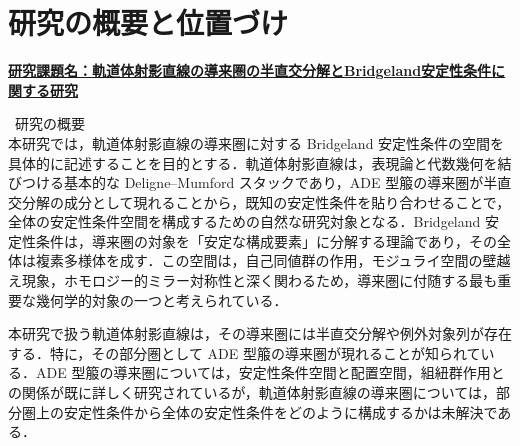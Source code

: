 \documentclass[11pt,a4paper]{ltjsarticle}
\newcommand{\研究課題名}{軌道体射影直線の導来圏の半直交分解とBridgeland安定性条件に関する研究}
\newcommand{\研究機関名}{大阪大学}
\newcommand{\研究代表者氏名}{山本 雄大}
\begin{document}

\section{研究の概要と位置づけ}

\noindent
\underline{\textbf{研究課題名：\研究課題名}}

\bullet\ 研究の概要\\ 本研究では，軌道体射影直線の導来圏に対する Bridgeland 安定性条件の空間を具体的に記述することを目的とする．軌道体射影直線は，表現論と代数幾何を結びつける基本的な Deligne--Mumford スタックであり，ADE 型箙の導来圏が半直交分解の成分として現れることから，既知の安定性条件を貼り合わせることで，全体の安定性条件空間を構成するための自然な研究対象となる．Bridgeland 安定性条件は，導来圏の対象を「安定な構成要素」に分解する理論であり，その全体は複素多様体を成す．この空間は，自己同値群の作用，モジュライ空間の壁越え現象，ホモロジー的ミラー対称性と深く関わるため，導来圏に付随する最も重要な幾何学的対象の一つと考えられている．

本研究で扱う軌道体射影直線は，その導来圏には半直交分解や例外対象列が存在する．特に，その部分圏として ADE 型箙の導来圏が現れることが知られている．ADE 型箙の導来圏については，安定性条件空間と配置空間，組紐群作用との関係が既に詳しく研究されているが，軌道体射影直線の導来圏については，部分圏上の安定性条件から全体の安定性条件をどのように構成するかは未解決である．
\end{document}
